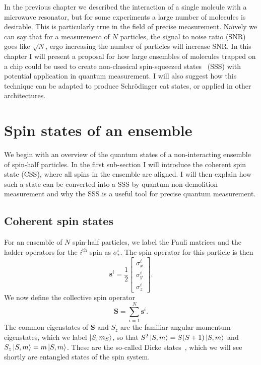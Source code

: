 In the previous chapter we described the interaction of a single molcule with a
microwave resonator, but for some experiments a large number of molecules is
desirable. This is particularly true in the field of precise measurement.
Na\"ively we can say that for a measurement of $N$ particles, the signal to
noise ratio (SNR) goes like $\sqrt{N}$, ergo increasing the number of particles
will increase SNR. In this chapter I will present a proposal for how large
ensembles of \CaF{} molecules trapped on a chip could be used to create
non-classical spin-squeezed states~\cite{} (SSS) with potential application in
quantum measurement. I will also suggest how this technique can be adapted to
produce Schr\"odinger cat states, or applied in other architectures.

\section{Spin states of an ensemble}

We begin with an overview of the quantum states of a non-interacting ensemble
of spin-half particles. In the first sub-section I will introduce the coherent
spin state (CSS), where all spins in the ensemble are aligned. I will then
explain how such a state can be converted into a SSS by quantum non-demolition
measurement and why the SSS is a useful tool for precise quantum measurement.

\subsection{Coherent spin states}

For an ensemble of $N$ spin-half particles, we label the Pauli matrices and the
ladder operators for the $i^\text{th}$ spin as $\sigma_*^i$. The spin operator
for this particle is then
%
\begin{equation}
  \mathbf{s}^i = \frac{1}{2}\begin{bmatrix} \sigma^i_x \\ \sigma^i_y \\ \sigma^i_z
\end{bmatrix}.
\end{equation}
%
We now define the collective spin operator
%
\begin{equation}
  \mathbf{S} = \sum_{i=1}^N \mathbf{s}^i.
\end{equation}
%
The common eigenstates of $\mathbf{S}$ and $S_z$ are the familiar angular
momentum eigenstates, which we label $\ket{S,m_S}$, so that $S^2 \ket{S,m} =
S(S+1)\ket{S, m}$ and $S_z \ket{S,m} = m\ket{S, m}$. These are the so-called
Dicke states~\cite{}, which we will see shortly are entangled states of the
spin system.

